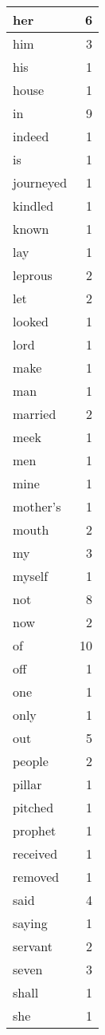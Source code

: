 \begin{center}
\begin{longtable}{l|r}
her & 6 \\ \hline
him & 3 \\ \hline
his & 1 \\ \hline
house & 1 \\ \hline
in & 9 \\ \hline
indeed & 1 \\ \hline
is & 1 \\ \hline
journeyed & 1 \\ \hline
kindled & 1 \\ \hline
known & 1 \\ \hline
lay & 1 \\ \hline
leprous & 2 \\ \hline
let & 2 \\ \hline
looked & 1 \\ \hline
lord & 1 \\ \hline
make & 1 \\ \hline
man & 1 \\ \hline
married & 2 \\ \hline
meek & 1 \\ \hline
men & 1 \\ \hline
mine & 1 \\ \hline
mother's & 1 \\ \hline
mouth & 2 \\ \hline
my & 3 \\ \hline
myself & 1 \\ \hline
not & 8 \\ \hline
now & 2 \\ \hline
of & 10 \\ \hline
off & 1 \\ \hline
one & 1 \\ \hline
only & 1 \\ \hline
out & 5 \\ \hline
people & 2 \\ \hline
pillar & 1 \\ \hline
pitched & 1 \\ \hline
prophet & 1 \\ \hline
received & 1 \\ \hline
removed & 1 \\ \hline
said & 4 \\ \hline
saying & 1 \\ \hline
servant & 2 \\ \hline
seven & 3 \\ \hline
shall & 1 \\ \hline
she & 1 \\ \hline

\end{longtable}
\end{center}
